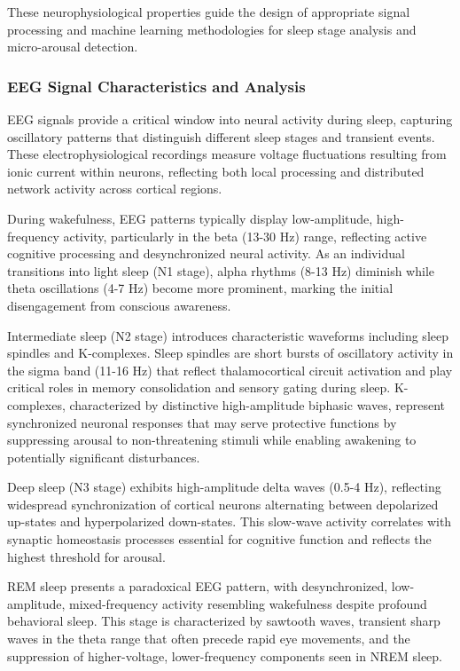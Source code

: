 \documentclass[a4paper,12pt,twoside]{article}
\begin{document}
These neurophysiological properties guide the design of appropriate signal processing and machine learning methodologies for sleep stage analysis and micro-arousal detection.

\subsubsection{EEG Signal Characteristics and Analysis}

EEG signals provide a critical window into neural activity during sleep, capturing oscillatory patterns that distinguish different sleep stages and transient events. These electrophysiological recordings measure voltage fluctuations resulting from ionic current within neurons, reflecting both local processing and distributed network activity across cortical regions.

During wakefulness, EEG patterns typically display low-amplitude, high-frequency activity, particularly in the beta (13-30 Hz) range, reflecting active cognitive processing and desynchronized neural activity. As an individual transitions into light sleep (N1 stage), alpha rhythms (8-13 Hz) diminish while theta oscillations (4-7 Hz) become more prominent, marking the initial disengagement from conscious awareness.

Intermediate sleep (N2 stage) introduces characteristic waveforms including sleep spindles and K-complexes. Sleep spindles are short bursts of oscillatory activity in the sigma band (11-16 Hz) that reflect thalamocortical circuit activation and play critical roles in memory consolidation and sensory gating during sleep. K-complexes, characterized by distinctive high-amplitude biphasic waves, represent synchronized neuronal responses that may serve protective functions by suppressing arousal to non-threatening stimuli while enabling awakening to potentially significant disturbances.

Deep sleep (N3 stage) exhibits high-amplitude delta waves (0.5-4 Hz), reflecting widespread synchronization of cortical neurons alternating between depolarized up-states and hyperpolarized down-states. This slow-wave activity correlates with synaptic homeostasis processes essential for cognitive function and reflects the highest threshold for arousal.

REM sleep presents a paradoxical EEG pattern, with desynchronized, low-amplitude, mixed-frequency activity resembling wakefulness despite profound behavioral sleep. This stage is characterized by sawtooth waves, transient sharp waves in the theta range that often precede rapid eye movements, and the suppression of higher-voltage, lower-frequency components seen in NREM sleep.
\end{document}
